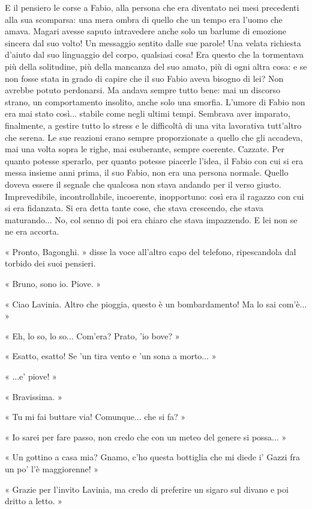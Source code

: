 E il pensiero le corse a Fabio, alla persona che era diventato nei mesi precedenti alla sua scomparsa: una mera ombra di quello che un tempo era l'uomo che amava. Magari avesse saputo intravedere anche solo un barlume di emozione sincera dal suo volto! Un messaggio sentito dalle sue parole! Una velata richiesta d'aiuto dal suo linguaggio del corpo, qualsiasi cosa! Era questo che la tormentava più della solitudine, più della mancanza del suo amato, più di ogni altra cosa: e se non fosse stata in grado di capire che il suo Fabio aveva bisogno di lei? Non avrebbe potuto perdonarsi. Ma andava sempre tutto bene: mai un discorso strano, un comportamento insolito, anche solo una smorfia. L'umore di Fabio non era mai stato così... stabile come negli ultimi tempi. Sembrava aver imparato, finalmente, a gestire tutto lo stress e le difficoltà di una vita lavorativa tutt'altro che serena. Le sue reazioni erano sempre proporzionate a quello che gli accadeva, mai una volta sopra le righe, mai esuberante, sempre coerente. Cazzate. Per quanto potesse sperarlo, per quanto potesse piacerle l'idea, il Fabio con cui si era messa insieme anni prima, il suo Fabio, non era una persona normale. Quello doveva essere il segnale che qualcosa non stava andando per il verso giusto. Imprevedibile, incontrollabile, incoerente, inopportuno: così era il ragazzo con cui si era fidanzata. Si era detta tante cose, che stava crescendo, che stava maturando... No, col senno di poi era chiaro che stava impazzendo. E lei non se ne era accorta.

« Pronto, Bagonghi. » disse la voce all'altro capo del telefono, ripescandola dal torbido dei suoi pensieri.

« Bruno, sono io. Piove. »

« Ciao Lavinia. Altro che pioggia, questo è un bombardamento! Ma lo sai com'è... »

« Eh, lo so, lo so... Com'era? Prato, 'io bove? »

« Esatto, esatto! Se 'un tira vento e 'un sona a morto... »

« ...e' piove! »

« Bravissima. »

« Tu mi fai buttare via! Comunque... che si fa? »

« Io sarei per fare passo, non credo che con un meteo del genere si possa... »

« Un gottino a casa mia? Gnamo, c'ho questa bottiglia che mi diede i' Gazzi fra un po' l'è maggiorenne! »

« Grazie per l'invito Lavinia, ma credo di preferire un sigaro sul divano e poi dritto a letto. »

